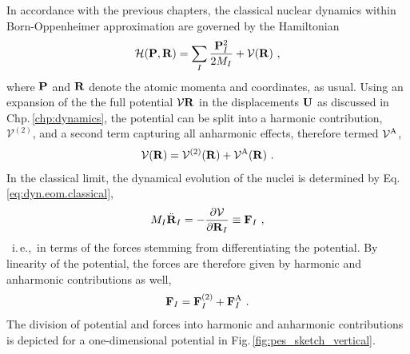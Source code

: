 In accordance with the previous chapters, the classical nuclear dynamics within Born-Oppenheimer approximation are governed by the Hamiltonian
\begin{align}
	\mathcal H ( {\bf P}, {\bf R}) 
		= \sum_I \frac{\b P_I^2}{2 M_I} + \mathcal V (\b R)~,
	\label{eq:anh.H}
\end{align}
where $\bf P$ and $\bf R$ denote the atomic momenta and coordinates, as usual. Using an expansion of the the full potential $\mathcal V {\bf R}$ in the displacements $\bf U$ as discussed in Chp.\,\ref{chp:dynamics}, the potential can be split into a harmonic contribution, $\mathcal V^{(2)}$, and a second term capturing all anharmonic effects, therefore termed $\mathcal V^{\rm A}$,
\begin{align}
	\mathcal V ({\bf R})
		= \mathcal V^{(2)} ({\bf R}) + \mathcal V^{\rm A} ({\bf R})~.
	\label{eq:anh.V}
\end{align}
In the classical limit, the dynamical evolution of the nuclei is determined by Eq.\,\eqref{eq:dyn.eom.classical},
\begin{align}
	M_I \ddot{\bf R}_I
		= -\frac{\partial \mathcal V}{\partial {\bf R}_I}
		\equiv {\bf F}_I~,
\end{align}
~i.\,e.,~in terms of the forces stemming from differentiating the potential. By linearity of the potential, the forces are therefore given by harmonic and anharmonic contributions as well,
\begin{align}
	{\bf F}_I
		= {\bf F}_I^{(2)} + {\bf F}_I^{\rm A}~.
	\label{eq:anh.F}
\end{align}
The division of potential and forces into harmonic and anharmonic contributions is depicted for a one-dimensional potential in Fig.\,\ref{fig:pes_sketch_vertical}.
